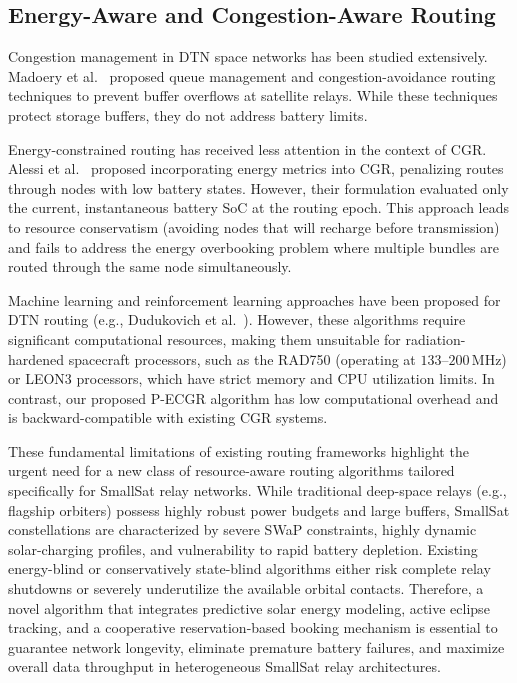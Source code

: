 \documentclass[a4paper,fleqn]{cas-dc}
\newcommand{\pecgr}{\textsf{P-ECGR}}
\begin{document}
\subsection{Energy-Aware and Congestion-Aware Routing}
Congestion management in DTN space networks has been studied extensively. Madoery et al.~\cite{madoery2020congestion} proposed queue management and congestion-avoidance routing techniques to prevent buffer overflows at satellite relays. While these techniques protect storage buffers, they do not address battery limits.

Energy-constrained routing has received less attention in the context of CGR. Alessi et al.~\cite{alessi2019energy} proposed incorporating energy metrics into CGR, penalizing routes through nodes with low battery states. However, their formulation evaluated only the current, instantaneous battery SoC at the routing epoch. This approach leads to resource conservatism (avoiding nodes that will recharge before transmission) and fails to address the energy overbooking problem where multiple bundles are routed through the same node simultaneously. 

Machine learning and reinforcement learning approaches have been proposed for DTN routing (e.g., Dudukovich et al.~\cite{dudukovich2019dtn}). However, these algorithms require significant computational resources, making them unsuitable for radiation-hardened spacecraft processors, such as the RAD750 (operating at $133$--$200\,$MHz) or LEON3 processors, which have strict memory and CPU utilization limits. In contrast, our proposed \pecgr{} algorithm has low computational overhead and is backward-compatible with existing CGR systems.

These fundamental limitations of existing routing frameworks highlight the urgent need for a new class of resource-aware routing algorithms tailored specifically for SmallSat relay networks. While traditional deep-space relays (e.g., flagship orbiters) possess highly robust power budgets and large buffers, SmallSat constellations are characterized by severe SWaP constraints, highly dynamic solar-charging profiles, and vulnerability to rapid battery depletion. Existing energy-blind or conservatively state-blind algorithms either risk complete relay shutdowns or severely underutilize the available orbital contacts. Therefore, a novel algorithm that integrates predictive solar energy modeling, active eclipse tracking, and a cooperative reservation-based booking mechanism is essential to guarantee network longevity, eliminate premature battery failures, and maximize overall data throughput in heterogeneous SmallSat relay architectures.
\end{document}
